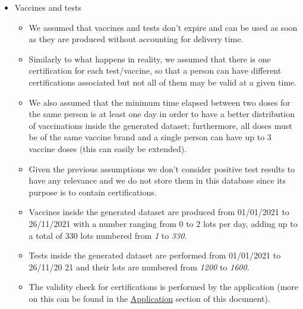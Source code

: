 \documentclass[12pt, a4paper]{article}
\begin{document}
\begin{itemize}

    \item Vaccines and tests
    \begin{itemize}
        \item[] We assumed that vaccines and tests don't expire and can be used 
            as soon as they are produced without accounting for delivery time.
        \item[] Similarly to what happens in reality, we assumed that there is one
            certification for each test/vaccine, so that a person can have different 
            certifications associated but not all of them may be valid at a given time.
        \item[] We also assumed that the minimum time elapsed between two doses
            for the same person is at least one day in order to have a better
            distribution of vaccinations inside the generated dataset;
            furthermore, all doses must be of the same vaccine brand and a
            single person can have up to 3 vaccine doses (this can easily be extended). 
        \item[] Given the previous assumptions we don't consider positive test 
            results to have any relevance and we do not store them in this database
            since its purpose is to contain certifications.
        \item[] Vaccines  inside the generated dataset are produced from 01/01/2021 to \\
            26/11/2021 with a number ranging from 0 to 2 lots per day, adding up to a 
            total of 330 lots numbered from \emph{1} to \emph{330}.
        \item[] Tests inside the generated dataset are performed from 01/01/2021 to \\ 
            26/11/20 21 and their lots are numbered from \emph{1200} to \emph{1600}.
        \item[] The validity check for certifications is performed by the application 
            (more on this can be found in the \hyperref[sec:Application]{Application} 
            section of this document).
    \end{itemize}


\end{itemize}
\end{document}
